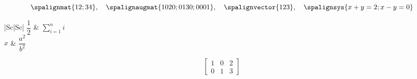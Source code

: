 \documentclass{amsart}
\begin{document}
\[ \spalignmat{1 2; 3 4}, \quad \spalignaugmat{1 0 2 0; 0 1 3 0; 0 0 0 1}, \quad \spalignvector{1 2 3}, \quad \spalignsys{x + y = 2; x - y = 0} \]
\begin{tabular}{|Sc|Sc|}
  \hline
  $\dfrac{1}{2}$ & $\displaystyle\sum_{i=1}^n i$ \\
  \hline
  $x$ & $\dfrac{a^2}{b^2}$ \\
  \hline
\end{tabular}
\[ \left[\begin{array}{cc|c} 1 & 0 & 2 \\ 0 & 1 & 3 \end{array}\right] \]
\end{document}

